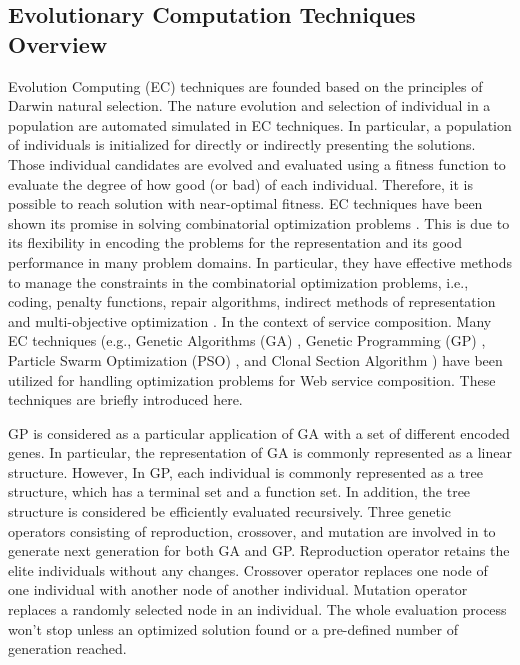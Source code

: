 \subsection{Evolutionary Computation Techniques Overview}\label{ec}

Evolution Computing (EC) techniques are founded based on the principles of Darwin natural selection. The nature evolution and selection of individual in a population are automated simulated in EC techniques. In particular, a population of individuals is initialized for directly or indirectly presenting the solutions. Those individual candidates are evolved and evaluated using a fitness function to evaluate the degree of how good (or bad) of each individual. Therefore, it is possible to reach solution with near-optimal fitness. EC techniques have been shown its promise in solving combinatorial optimization problems \cite{back1997evolutionary}. This is due to its flexibility in encoding the problems for the representation and its good performance in many problem domains. In particular, they have effective methods to manage the constraints in the combinatorial optimization problems, i.e., coding, penalty functions, repair algorithms, indirect methods of representation and multi-objective optimization \cite{fleming2002evolutionary}. In the context of service composition. Many EC techniques (e.g., Genetic Algorithms (GA) \cite{whitley1994genetic}, Genetic Programming (GP) \cite{koza1992genetic}, Particle Swarm Optimization (PSO) \cite{kennedy1995particle}, and Clonal Section Algorithm \cite{de2002learning}) have been utilized for handling optimization problems for Web service composition. These techniques are briefly introduced here.

GP is considered as a particular application of GA with a set of different encoded genes. In particular, the representation of GA is commonly represented as a linear structure. However, In GP, each individual is commonly represented as a tree structure, which has a terminal set and a function set. In addition, the tree structure is considered be efficiently evaluated recursively. Three genetic operators consisting of reproduction, crossover, and mutation are involved in to generate next generation for both GA and GP. Reproduction operator retains the elite individuals without any changes. Crossover operator replaces one node of one individual with another node of another individual. Mutation operator replaces a randomly selected node in an individual. The whole evaluation process won't stop unless an optimized solution found or a pre-defined number of generation reached.

